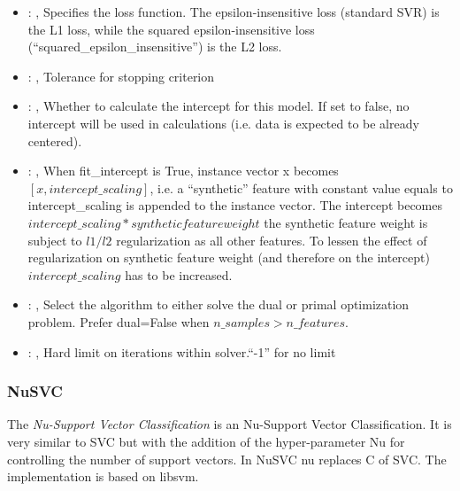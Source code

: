 \begin{itemize}
    \item {}: ,
      Specifies the loss function. The epsilon-insensitive loss (standard SVR)
      is the L1 loss, while the squared epsilon-insensitive loss (``squared\_epsilon\_insensitive'')
      is the L2 loss.

    \item {}: ,
      Tolerance for stopping criterion

    \item {}: ,
      Whether to calculate the intercept for this model. If set to false, no
      intercept will be used in calculations (i.e. data is expected to be already centered).

    \item {}: ,
      When fit\_intercept is True, instance vector x becomes $[x, intercept\_scaling]$,
      i.e. a “synthetic” feature with constant value equals to intercept\_scaling is appended
      to the instance vector. The intercept becomes $intercept\_scaling * synthetic feature weight$
      \nb the synthetic feature weight is subject to $l1/l2$ regularization as all other features.
      To lessen the effect of regularization on synthetic feature weight (and therefore on the
      intercept)                                                  $intercept\_scaling$ has to be
      increased.

    \item {}: ,
      Select the algorithm to either solve the dual or primal optimization problem.
      Prefer dual=False when $n\_samples > n\_features$.

    \item {}: ,
      Hard limit on iterations within solver.``-1'' for no limit
  \end{itemize}


\subsubsection{NuSVC}
  The  \textit{Nu-Support Vector Classification} is an Nu-Support Vector
  Classification.                             It is very similar to SVC but with the addition of the
  hyper-parameter Nu for controlling the                             number of support vectors. In
  NuSVC nu replaces C of SVC.                             The implementation is based on libsvm.

